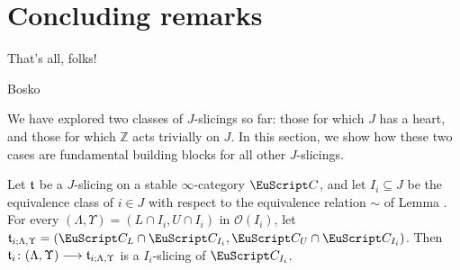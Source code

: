 \section{Concluding remarks}
\label{concluding}
\begin{modifyepigraph}{.2}
\epigraph{That's all, folks!}{Bosko}
\end{modifyepigraph}

We have explored two classes of $J$-slicings so far: those for which $J$ has a heart, and those for which $\mathbb{Z}$ acts trivially on $J$. In this section, we show how these two cases are fundamental building blocks for all other $J$-slicings. 
\begin{lemma}\label{for-the-main-theorem}
Let $\mathfrak{t}$ be a $J$-slicing on a stable $\infty$-category $\C$, and let $I_i\subseteq J$ be the equivalence class of $i\in J$ with respect to the equivalence relation $\sim$ of Lemma . For every $(\Lambda,\Upsilon)=(L\cap I_{i},U\cap I_{i})$ in $\mathcal{O}(I_i)$, let $\tee_{i;\Lambda,\Upsilon}=(\C_L\cap \C_{I_i},\C_U\cap \C_{I_i})$. Then $\mathfrak{t}_i\colon (\Lambda,\Upsilon)\longrightarrow \mathfrak{t}_{i;\Lambda,\Upsilon}$ is a $I_i$-slicing of $\C_{I_i}$.
\end{lemma}
